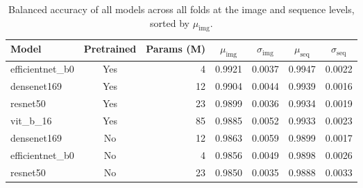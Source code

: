 \begin{table}[H]
\caption{Balanced accuracy of all models across all folds at the image and sequence levels, sorted by $\mu_{\mathrm{img}}$.}
\label{tab:bal_acc}
\begin{tabular}{l c r c c c c}
\toprule
Model & Pretrained & Params (M) & $\mu_{\mathrm{img}}$ & $\sigma_{\mathrm{img}}$ & $\mu_{\mathrm{seq}}$ & $\sigma_{\mathrm{seq}}$ \\
\midrule
efficientnet\_b0 & Yes & 4 & 0.9921 & 0.0037 & 0.9947 & 0.0022 \\
densenet169 & Yes & 12 & 0.9904 & 0.0044 & 0.9939 & 0.0016 \\
resnet50 & Yes & 23 & 0.9899 & 0.0036 & 0.9934 & 0.0019 \\
vit\_b\_16 & Yes & 85 & 0.9885 & 0.0052 & 0.9933 & 0.0023 \\
densenet169 & No & 12 & 0.9863 & 0.0059 & 0.9899 & 0.0017 \\
efficientnet\_b0 & No & 4 & 0.9856 & 0.0049 & 0.9898 & 0.0026 \\
resnet50 & No & 23 & 0.9850 & 0.0035 & 0.9888 & 0.0033 \\
\bottomrule
\end{tabular}
\end{table}
